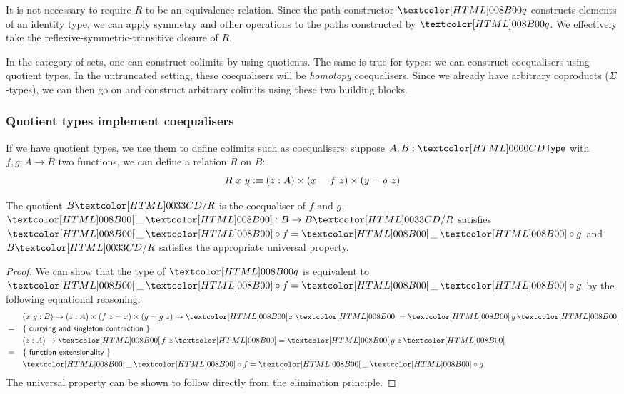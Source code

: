 It is not necessary to require $R$ to be an equivalence
relation. Since the path constructor $\quoteq$ constructs elements of
an identity type, we can apply symmetry and other operations to the
paths constructed by $\quoteq$. We effectively take the
reflexive-symmetric-transitive closure of $R$.

In the category of sets, one can construct colimits by using
quotients. The same is true for types: we can construct coequalisers
using quotient types. In the untruncated setting, these coequalisers
will be \emph{homotopy} coequalisers. Since we already have arbitrary
coproducts ($\Sigma$-types), we can then go on and construct arbitrary
colimits using these two building blocks.

\subsubsection{Quotient types implement coequalisers}
If we have quotient types, we use them to define colimits such as
coequalisers: suppose $A, B : \Type$ with $f, g : A \to B$ two
functions, we can define a relation $R$ on $B$:
$$
R\ x\ y :\equiv (z : A) \times (x = f\ z) \times (y = g\ z)
$$

\begin{proposition}
  The quotient $\quotty{B}{R}$ is the coequaliser of $f$ and $g$, \ie
  $\quotproj{\_} : B \to \quotty{B}{R}$ satisfies
  $\quotproj{\_} \circ f = \quotproj{\_} \circ g$ and $\quotty{B}{R}$
  satisfies the appropriate universal property.
\end{proposition}

\begin{proof}
  We can show that the type of $\quoteq$ is equivalent to
  $\quotproj{\_} \circ f = \quotproj{\_} \circ g$ by the following
  equational reasoning:
  \begin{align*}
    &&&(x\ y : B) \to (z : A) \times (f\ z = x) \times (y = g\ z) \to \quotproj{x} = \quotproj{y} \\
    &=& &\reasontext{currying and singleton contraction} \\
    &&& (z : A) \to \quotproj{f\ z} = \quotproj{g\ z} \\
    &=& &\reasontext{function extensionality} \\
    &&& \quotproj{\_} \circ f = \quotproj{\_} \circ g
  \end{align*}
  The universal property can be shown to follow directly from the
  elimination principle.
\end{proof}
